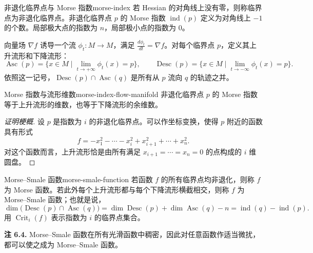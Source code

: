 \begin{definition}{非退化临界点与 Morse 指数}{morse-index}
若 Hessian 的对角线上没有零，则称临界点为非退化临界点。非退化临界点 $p$ 的 Morse 指数 $\operatorname{ind}(p)$ 定义为对角线上 $-1$ 的个数。局部极大点的指数为 $n$，局部极小点的指数为 $0$。
\end{definition}

向量场 $\nabla f$ 诱导一个流 $\phi_t\colon M\to M$，满足 $\frac{d\phi_t}{dt}=\nabla f$。对每个临界点 $p$，定义其上升流形和下降流形：
\[
  \operatorname{Asc}(p)=\{x\in M\mid\lim_{t\to+\infty}\phi_t(x)=p\},\qquad
  \operatorname{Desc}(p)=\{x\in M\mid\lim_{t\to-\infty}\phi_t(x)=p\}.
\]
依照这一记号，$\operatorname{Desc}(p)\cap\operatorname{Asc}(q)$ 是所有从 $p$ 流向 $q$ 的轨迹之并。

\begin{lemma}{Morse 指数与流形维数}{morse-index-flow-manifold}
非退化临界点 $p$ 的 Morse 指数等于上升流形的维数，也等于下降流形的余维数。
\end{lemma}
\begin{proof}[证明梗概]
设 $p$ 是指数为 $i$ 的非退化临界点。可以作坐标变换，使得 $p$ 附近的函数具有形式
\[
  f=-x_1^2-\cdots-x_i^2+x_{i+1}^2+\cdots+x_n^2.
\]
对这个函数而言，上升流形恰是由所有满足 $x_{i+1}=\cdots=x_n=0$ 的点构成的 $i$ 维圆盘。
\end{proof}

\begin{definition}{Morse--Smale 函数}{morse-smale-function}
若函数 $f$ 的所有临界点均非退化，则称 $f$ 为 Morse 函数。若此外每个上升流形都与每个下降流形横截相交，则称 $f$ 为 Morse--Smale 函数；也就是说，
\[
  \dim\bigl(\operatorname{Desc}(p)\cap\operatorname{Asc}(q)\bigr)
  =\dim\operatorname{Desc}(p)+\dim\operatorname{Asc}(q)-n
  =\operatorname{ind}(q)-\operatorname{ind}(p).
\]
用 $\operatorname{Crit}_i(f)$ 表示指数为 $i$ 的临界点集合。
\end{definition}

\begin{note}\label{note:morse-smale-generic}
\textbf{注 6.4.} Morse--Smale 函数在所有光滑函数中稠密，因此对任意函数作适当微扰，都可以使之成为 Morse--Smale 函数。
\end{note}


